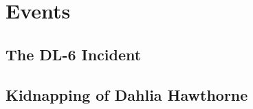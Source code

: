 
\section{Events}
\subsection{The DL-6 Incident}
\label{events:dl6}


\subsection{Kidnapping of Dahlia Hawthorne}
\label{events:kidnapdh}